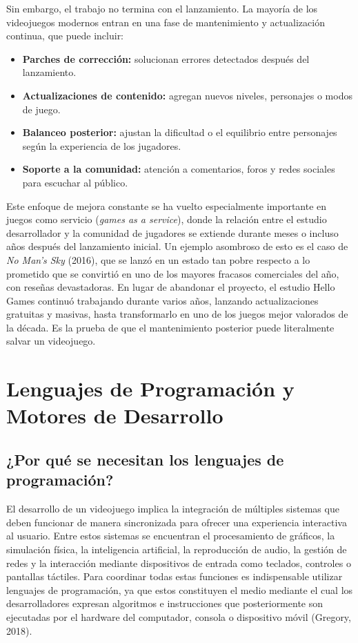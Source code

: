 \documentclass[12pt]{report}
\begin{document}
Sin embargo, el trabajo no termina con el lanzamiento. La mayoría de los videojuegos modernos entran en una fase de mantenimiento y actualización continua, que puede incluir:

\begin{itemize}
    \item \textbf{Parches de corrección:} solucionan errores detectados después del lanzamiento.
    \item \textbf{Actualizaciones de contenido:} agregan nuevos niveles, personajes o modos de juego.
    \item \textbf{Balanceo posterior:} ajustan la dificultad o el equilibrio entre personajes según la experiencia de los jugadores.
    \item \textbf{Soporte a la comunidad:} atención a comentarios, foros y redes sociales para escuchar al público.
\end{itemize}

Este enfoque de mejora constante se ha vuelto especialmente importante en juegos como servicio (\textit{games as a service}), donde la relación entre el estudio desarrollador y la comunidad de jugadores se extiende durante meses o incluso años después del lanzamiento inicial. Un ejemplo asombroso de esto es el caso de \textit{No Man's Sky} (2016), que se lanzó en un estado tan pobre respecto a lo prometido que se convirtió en uno de los mayores fracasos comerciales del año, con reseñas devastadoras. En lugar de abandonar el proyecto, el estudio Hello Games continuó trabajando durante varios años, lanzando actualizaciones gratuitas y masivas, hasta transformarlo en uno de los juegos mejor valorados de la década. Es la prueba de que el mantenimiento posterior puede literalmente salvar un videojuego.

\chapter{Lenguajes de Programación y Motores de Desarrollo}

\section{¿Por qué se necesitan los lenguajes de programación?}

El desarrollo de un videojuego implica la integración de múltiples sistemas que deben funcionar de manera sincronizada para ofrecer una experiencia interactiva al usuario. Entre estos sistemas se encuentran el procesamiento de gráficos, la simulación física, la inteligencia artificial, la reproducción de audio, la gestión de redes y la interacción mediante dispositivos de entrada como teclados, controles o pantallas táctiles. Para coordinar todas estas funciones es indispensable utilizar lenguajes de programación, ya que estos constituyen el medio mediante el cual los desarrolladores expresan algoritmos e instrucciones que posteriormente son ejecutadas por el hardware del computador, consola o dispositivo móvil (Gregory, 2018).
\end{document}
